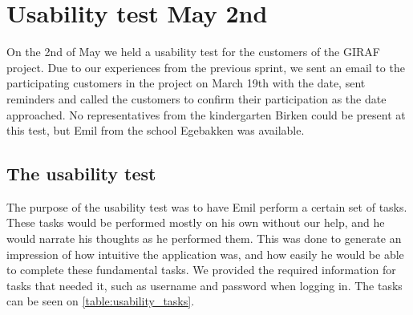 \section{Usability test May 2nd}\label{usability-test-sprint-3}
On the 2nd of May we held a usability test for the customers of the GIRAF project.
Due to our experiences from the previous sprint, we sent an email to the participating customers in the project on March 19th with the date, sent reminders and called the customers to confirm their participation as the date approached.
No representatives from the kindergarten Birken could be present at this test, but Emil from the school Egebakken was available.

\subsection{The usability test}
The purpose of the usability test was to have Emil perform a certain set of tasks.
These tasks would be performed mostly on his own without our help, and he would narrate his thoughts as he performed them.
This was done to generate an impression of how intuitive the application was, and how easily he would be able to complete these fundamental tasks.
We provided the required information for tasks that needed it, such as username and password when logging in. 
The tasks can be seen on \autoref{table:usability_tasks}.

